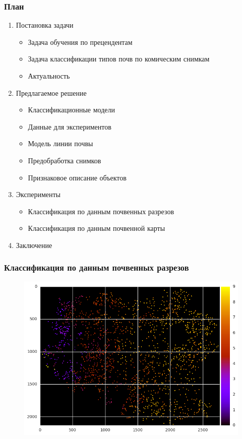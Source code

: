 \documentclass{beamer}
\begin{document}
\begin{frame}
\frametitle{План}
\begin{enumerate}
    \item Постановка задачи
        \begin{itemize}
            \item Задача обучения по прецендентам
            \item Задача классификации типов почв по комическим снимкам
            \item Актуальность
        \end{itemize}
    \item Предлагаемое решение
    \begin{itemize}
        \item Классификационные модели
        \item Данные для экспериментов
        \item Модель линии почвы
        \item Предобработка снимков
        \item Признаковое описание объектов
    \end{itemize}
    \item {\color{blue} Эксперименты}
    \begin{itemize}
        \item Классификация по данным почвенных разрезов
        \item Классификация по данным почвенной карты
    \end{itemize}
    \item Заключение
\end{enumerate}
\end{frame}

\begin{frame}
\frametitle{Классификация по данным почвенных разрезов}
\begin{figure}[H]
\centering
\includegraphics[width=0.8\linewidth]{imgs/cuts.png}
\end{figure}
\end{frame}
\end{document}
